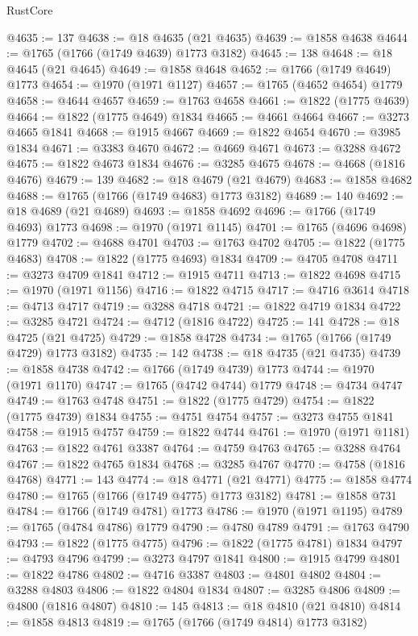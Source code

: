 \begin{lexlean}{RustCore}
\begin{coremodule}
@4635 := 137
@4638 := @18 @4635 (@21 @4635)
@4639 := @1858 @4638
@4644 := @1765 (@1766 (@1749 @4639) @1773 @3182)
@4645 := 138
@4648 := @18 @4645 (@21 @4645)
@4649 := @1858 @4648
@4652 := @1766 (@1749 @4649) @1773
@4654 := @1970 (@1971 @1127)
@4657 := @1765 (@4652 @4654) @1779
@4658 := @4644 @4657
@4659 := @1763 @4658
@4661 := @1822 (@1775 @4639)
@4664 := @1822 (@1775 @4649) @1834
@4665 := @4661 @4664
@4667 := @3273 @4665 @1841
@4668 := @1915 @4667
@4669 := @1822 @4654
@4670 := @3985 @1834
@4671 := @3383 @4670
@4672 := @4669 @4671
@4673 := @3288 @4672
@4675 := @1822 @4673 @1834
@4676 := @3285 @4675
@4678 := @4668 (@1816 @4676)
@4679 := 139
@4682 := @18 @4679 (@21 @4679)
@4683 := @1858 @4682
@4688 := @1765 (@1766 (@1749 @4683) @1773 @3182)
@4689 := 140
@4692 := @18 @4689 (@21 @4689)
@4693 := @1858 @4692
@4696 := @1766 (@1749 @4693) @1773
@4698 := @1970 (@1971 @1145)
@4701 := @1765 (@4696 @4698) @1779
@4702 := @4688 @4701
@4703 := @1763 @4702
@4705 := @1822 (@1775 @4683)
@4708 := @1822 (@1775 @4693) @1834
@4709 := @4705 @4708
@4711 := @3273 @4709 @1841
@4712 := @1915 @4711
@4713 := @1822 @4698
@4715 := @1970 (@1971 @1156)
@4716 := @1822 @4715
@4717 := @4716 @3614
@4718 := @4713 @4717
@4719 := @3288 @4718
@4721 := @1822 @4719 @1834
@4722 := @3285 @4721
@4724 := @4712 (@1816 @4722)
@4725 := 141
@4728 := @18 @4725 (@21 @4725)
@4729 := @1858 @4728
@4734 := @1765 (@1766 (@1749 @4729) @1773 @3182)
@4735 := 142
@4738 := @18 @4735 (@21 @4735)
@4739 := @1858 @4738
@4742 := @1766 (@1749 @4739) @1773
@4744 := @1970 (@1971 @1170)
@4747 := @1765 (@4742 @4744) @1779
@4748 := @4734 @4747
@4749 := @1763 @4748
@4751 := @1822 (@1775 @4729)
@4754 := @1822 (@1775 @4739) @1834
@4755 := @4751 @4754
@4757 := @3273 @4755 @1841
@4758 := @1915 @4757
@4759 := @1822 @4744
@4761 := @1970 (@1971 @1181)
@4763 := @1822 @4761 @3387
@4764 := @4759 @4763
@4765 := @3288 @4764
@4767 := @1822 @4765 @1834
@4768 := @3285 @4767
@4770 := @4758 (@1816 @4768)
@4771 := 143
@4774 := @18 @4771 (@21 @4771)
@4775 := @1858 @4774
@4780 := @1765 (@1766 (@1749 @4775) @1773 @3182)
@4781 := @1858 @731
@4784 := @1766 (@1749 @4781) @1773
@4786 := @1970 (@1971 @1195)
@4789 := @1765 (@4784 @4786) @1779
@4790 := @4780 @4789
@4791 := @1763 @4790
@4793 := @1822 (@1775 @4775)
@4796 := @1822 (@1775 @4781) @1834
@4797 := @4793 @4796
@4799 := @3273 @4797 @1841
@4800 := @1915 @4799
@4801 := @1822 @4786
@4802 := @4716 @3387
@4803 := @4801 @4802
@4804 := @3288 @4803
@4806 := @1822 @4804 @1834
@4807 := @3285 @4806
@4809 := @4800 (@1816 @4807)
@4810 := 145
@4813 := @18 @4810 (@21 @4810)
@4814 := @1858 @4813
@4819 := @1765 (@1766 (@1749 @4814) @1773 @3182)

\end{coremodule}
\end{lexlean}
